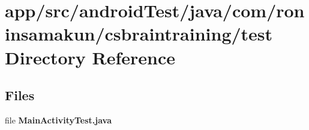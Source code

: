 \section{app/src/android\+Test/java/com/roninsamakun/csbraintraining/test Directory Reference}
\label{dir_4c345ea0ea1c9fde23a1db7594f1075f}
\subsection*{Files}
\begin{DoxyCompactItemize}
\item 
file {\bfseries Main\+Activity\+Test.\+java}
\end{DoxyCompactItemize}
